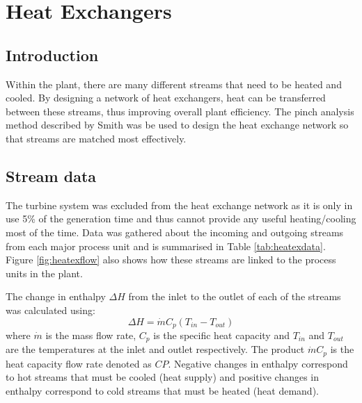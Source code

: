 


%

\section{Heat Exchangers}
\subsection{Introduction}

Within the plant, there are many different streams that need to be heated and cooled. By designing a network of heat exchangers, heat can be transferred between these streams, thus improving overall plant efficiency. The pinch analysis method described by Smith \cite{hexbook} \cite{lecture:hex} was be used to design the heat exchange network so that streams are matched most effectively. 

\subsection{Stream data}
The turbine system was excluded from the heat exchange network as it is only in use 5\% of the generation time and thus cannot provide any useful heating/cooling most of the time. Data was gathered about the incoming and outgoing streams from each major process unit and is summarised in Table \ref{tab:heatexdata}. Figure \ref{fig:heatexflow} also shows how these streams are linked to the process units in the plant.

The change in enthalpy $\Delta H$ from the inlet to the outlet of each of the streams was calculated using:
\begin{equation} \label{eq:heatex}
\Delta H = \dot{m} C_p (T_{in} - T_{out})
\end{equation}
where $\dot{m}$ is the mass flow rate, $C_p$ is the specific heat capacity and $T_{in}$ and $T_{out}$ are the temperatures at the inlet and outlet respectively. The product $\dot{m} C_p$ is the heat capacity flow rate denoted as $CP$. Negative changes in enthalpy correspond to hot streams that must be cooled (heat supply) and positive changes in enthalpy correspond to cold streams that must be heated (heat demand).

